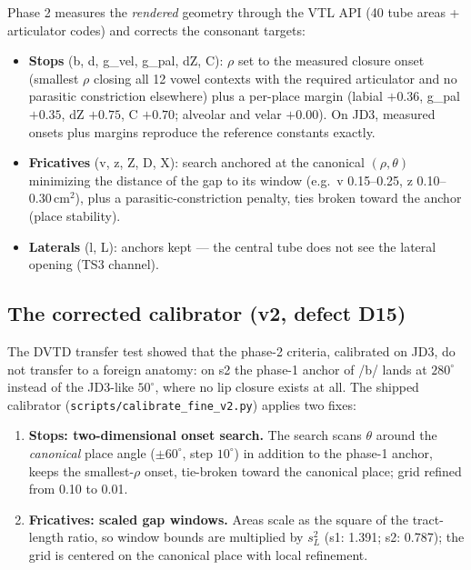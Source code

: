\documentclass[11pt,a4paper]{article}
\newcommand{\code}[1]{\texttt{#1}}
\begin{document}
Phase 2 measures the \emph{rendered} geometry through the VTL API
(40 tube areas + articulator codes) and corrects the consonant
targets:

\begin{itemize}[leftmargin=1.5em]
\item \textbf{Stops} (b, d, g\_vel, g\_pal, dZ, C): $\rho$ set to the
      measured closure onset (smallest $\rho$ closing all 12 vowel
      contexts with the required articulator and no parasitic
      constriction elsewhere) plus a per-place margin (labial
      $+0.36$, g\_pal $+0.35$, dZ $+0.75$, C $+0.70$; alveolar and
      velar $+0.00$). On JD3, measured onsets plus margins reproduce
      the reference constants exactly.
\item \textbf{Fricatives} (v, z, Z, D, X): search anchored at the
      canonical $(\rho, \theta)$ minimizing the distance of the gap
      to its window (e.g.\ v 0.15--0.25, z 0.10--0.30\,cm$^2$), plus
      a parasitic-constriction penalty, ties broken toward the
      anchor (place stability).
\item \textbf{Laterals} (l, L): anchors kept --- the central tube
      does not see the lateral opening (TS3 channel).
\end{itemize}

\subsection{The corrected calibrator (v2, defect D15)}

The DVTD transfer test showed that the phase-2 criteria, calibrated
on JD3, do not transfer to a foreign anatomy: on s2 the phase-1
anchor of /b/ lands at $280^\circ$ instead of the JD3-like
$50^\circ$, where no lip closure exists at all. The shipped
calibrator (\code{scripts/calibrate\_fine\_v2.py}) applies two fixes:

\begin{enumerate}[leftmargin=1.8em]
\item \textbf{Stops: two-dimensional onset search.} The search scans
      $\theta$ around the \emph{canonical} place angle
      ($\pm60^\circ$, step $10^\circ$) in addition to the phase-1
      anchor, keeps the smallest-$\rho$ onset, tie-broken toward the
      canonical place; grid refined from 0.10 to 0.01.
\item \textbf{Fricatives: scaled gap windows.} Areas scale as the
      square of the tract-length ratio, so window bounds are
      multiplied by $s_L^2$ (s1: 1.391; s2: 0.787); the grid is
      centered on the canonical place with local refinement.
\end{enumerate}
\end{document}
